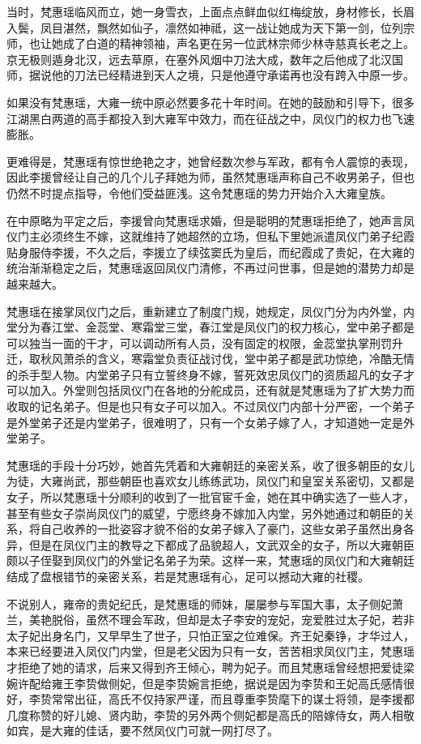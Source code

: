 当时，梵惠瑶临风而立，她一身雪衣，上面点点鲜血似红梅绽放，身材修长，长眉入鬓，凤目湛然，飘然如仙子，凛然如神祗，这一战让她成为天下第一剑，位列宗师，也让她成了白道的精神领袖，声名更在另一位武林宗师少林寺慈真长老之上。京无极则遁身北汉，远去草原，在塞外风烟中刀法大成，数年之后他成了北汉国师，据说他的刀法已经精进到天人之境，只是他遵守承诺再也没有跨入中原一步。

如果没有梵惠瑶，大雍一统中原必然要多花十年时间。在她的鼓励和引导下，很多江湖黑白两道的高手都投入到大雍军中效力，而在征战之中，凤仪门的权力也飞速膨胀。

更难得是，梵惠瑶有惊世绝艳之才，她曾经数次参与军政，都有令人震惊的表现，因此李援曾经让自己的几个儿子拜她为师，虽然梵惠瑶声称自己不收男弟子，但也仍然不时提点指导，令他们受益匪浅。这令梵惠瑶的势力开始介入大雍皇族。

在中原略为平定之后，李援曾向梵惠瑶求婚，但是聪明的梵惠瑶拒绝了，她声言凤仪门主必须终生不嫁，这就维持了她超然的立场，但私下里她派遣凤仪门弟子纪霞贴身服侍李援，不久之后，李援立了续弦窦氏为皇后，而纪霞成了贵妃，在大雍的统治渐渐稳定之后，梵惠瑶返回凤仪门清修，不再过问世事，但是她的潜势力却是越来越大。

梵惠瑶在接掌凤仪门之后，重新建立了制度门规，她规定，凤仪门分为内外堂，内堂分为春江堂、金蕊堂、寒霜堂三堂，春江堂是凤仪门的权力核心，堂中弟子都是可以独当一面的干才，可以调动所有人员，没有固定的权限，金蕊堂执掌刑罚升迁，取秋风萧杀的含义，寒霜堂负责征战讨伐，堂中弟子都是武功惊绝，冷酷无情的杀手型人物。内堂弟子只有立誓终身不嫁，誓死效忠凤仪门的资质超凡的女子才可以加入。外堂则包括凤仪门在各地的分舵成员，还有就是梵惠瑶为了扩大势力而收取的记名弟子。但是也只有女子可以加入。不过凤仪门内部十分严密，一个弟子是外堂弟子还是内堂弟子，很难明了，只有一个女弟子嫁了人，才知道她一定是外堂弟子。

梵惠瑶的手段十分巧妙，她首先凭着和大雍朝廷的亲密关系，收了很多朝臣的女儿为徒，大雍尚武，那些朝臣也喜欢女儿练练武功，凤仪门和皇室关系密切，又都是女子，所以梵惠瑶十分顺利的收到了一批官宦千金，她在其中确实选了一些人才，甚至有些女子崇尚凤仪门的威望，宁愿终身不嫁加入内堂，另外她通过和朝臣的关系，将自己收养的一批姿容才貌不俗的女弟子嫁入了豪门，这些女弟子虽然出身各异，但是在凤仪门主的教导之下都成了品貌超人，文武双全的女子，所以大雍朝臣颇以子侄娶到凤仪门的外堂记名弟子为荣。这样一来，梵惠瑶的凤仪门和大雍朝廷结成了盘根错节的亲密关系，若是梵惠瑶有心，足可以撼动大雍的社稷。

不说别人，雍帝的贵妃纪氏，是梵惠瑶的师妹，屡屡参与军国大事，太子侧妃萧兰，美艳脱俗，虽然不理会军政，但却是太子李安的宠妃，宠爱胜过太子妃，若非太子妃出身名门，又早早生了世子，只怕正室之位难保。齐王妃秦铮，才华过人，本来已经要进入凤仪门内堂，但是老父因为只有一女，苦苦相求凤仪门主，梵惠瑶才拒绝了她的请求，后来又得到齐王倾心，聘为妃子。而且梵惠瑶曾经想把爱徒梁婉许配给雍王李贽做侧妃，但是李贽婉言拒绝，据说是因为李贽和王妃高氏感情很好，李贽常常出征，高氏不仅持家严谨，而且尊重李贽麾下的谋士将领，是李援都几度称赞的好儿媳、贤内助，李贽的另外两个侧妃都是高氏的陪嫁侍女，两人相敬如宾，是大雍的佳话，要不然凤仪门可就一网打尽了。

